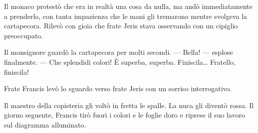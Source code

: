 Il monaco protestò che era in realtà una cosa da nulla, ma andò
immediatamente a prenderlo, con tanta impazienza che le mani gli
tremarono mentre svolgeva la cartapecora. Rilevò con gioia che frate
Jeris stava osservando con un cipiglio preoccupato.

Il monsignore guardò la cartapecora per molti secondi. --- Bella! ---
esplose finalmente. --- Che splendidi colori! È superba, superba.
Finiscila\ldots{} Fratello, finiscila!

Frate Francis levò lo sguardo verso frate Jeris con un sorriso
interrogativo.

Il maestro della copisteria gli voltò in fretta le spalle. La nuca gli
diventò rossa. Il giorno seguente, Francis tirò fuori i colori e le
foglie d\textquotesingle oro e riprese il suo lavoro sul diagramma
alluminato.
